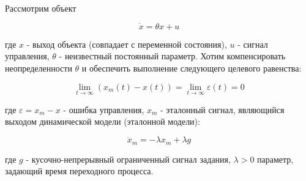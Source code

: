 Рассмотрим объект 

$$
    \dot{x} = \theta x + u
$$

где $x$ - выход объекта (совпадает с переменной состояния), $u$ - сигнал
управления, $\theta$ - неизвестный постоянный параметр. Хотим компенсировать неопределенности $\theta$ и обеспечить выполнение следующего целевого равенства:

\begin{equation}
    \lim_{t \rightarrow \infty} (x_m(t) - x(t)) = \lim_{t \rightarrow \infty} \varepsilon(t) = 0
    \label{goal}
\end{equation}

где $\varepsilon = x_m - x$ - ошибка управления, $x_m$ - эталонный сигнал, являющийся выходом динамической модели (эталонной модели):

$$
    \dot{x}_m = -\lambda x_m + \lambda g
$$

где $g$ - кусочно-непрерывный ограниченный сигнал задания, $\lambda > 0$ параметр, задающий время переходного процесса.
